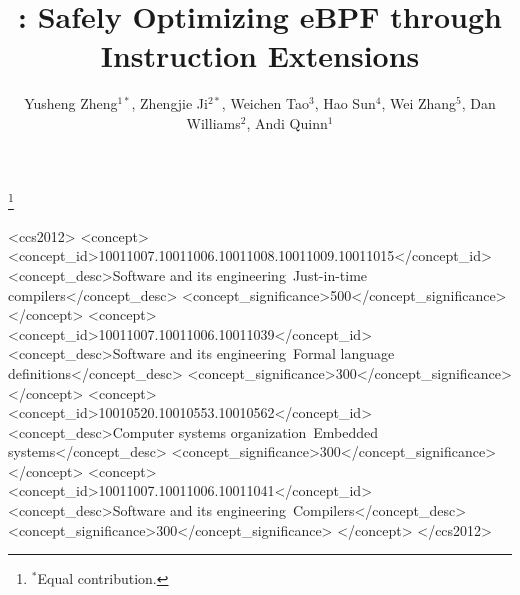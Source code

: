 \documentclass[sigplan,10pt]{acmart}
\begin{document}
\title{\tool: Safely Optimizing eBPF through Instruction Extensions}

\author{Yusheng Zheng$^{1*}$, Zhengjie Ji$^{2*}$, Weichen Tao$^{3}$, Hao Sun$^{4}$, Wei Zhang$^{5}$, Dan Williams$^{2}$, Andi Quinn$^{1}$}
\thanks{$^*$Equal contribution.}
\renewcommand{\authorsaddresses}{}

\renewcommand{\shortauthors}{Zheng et al.}




\begin{CCSXML}
<ccs2012>
 <concept>
  <concept_id>10011007.10011006.10011008.10011009.10011015</concept_id>
  <concept_desc>Software and its engineering~Just-in-time compilers</concept_desc>
  <concept_significance>500</concept_significance>
 </concept>
 <concept>
  <concept_id>10011007.10011006.10011039</concept_id>
  <concept_desc>Software and its engineering~Formal language definitions</concept_desc>
  <concept_significance>300</concept_significance>
 </concept>
 <concept>
  <concept_id>10010520.10010553.10010562</concept_id>
  <concept_desc>Computer systems organization~Embedded systems</concept_desc>
  <concept_significance>300</concept_significance>
 </concept>
 <concept>
  <concept_id>10011007.10011006.10011041</concept_id>
  <concept_desc>Software and its engineering~Compilers</concept_desc>
  <concept_significance>300</concept_significance>
 </concept>
</ccs2012>
\end{CCSXML}

\end{document}
